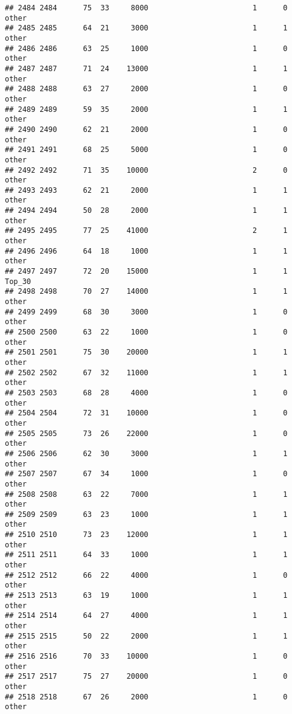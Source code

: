\documentclass[
]{article}
\begin{document}
\begin{verbatim}
## 2484 2484      75  33     8000                        1      0    other
## 2485 2485      64  21     3000                        1      1    other
## 2486 2486      63  25     1000                        1      0    other
## 2487 2487      71  24    13000                        1      1    other
## 2488 2488      63  27     2000                        1      0    other
## 2489 2489      59  35     2000                        1      1    other
## 2490 2490      62  21     2000                        1      0    other
## 2491 2491      68  25     5000                        1      0    other
## 2492 2492      71  35    10000                        2      0    other
## 2493 2493      62  21     2000                        1      1    other
## 2494 2494      50  28     2000                        1      1    other
## 2495 2495      77  25    41000                        2      1    other
## 2496 2496      64  18     1000                        1      1    other
## 2497 2497      72  20    15000                        1      1   Top_30
## 2498 2498      70  27    14000                        1      1    other
## 2499 2499      68  30     3000                        1      0    other
## 2500 2500      63  22     1000                        1      0    other
## 2501 2501      75  30    20000                        1      1    other
## 2502 2502      67  32    11000                        1      1    other
## 2503 2503      68  28     4000                        1      0    other
## 2504 2504      72  31    10000                        1      0    other
## 2505 2505      73  26    22000                        1      0    other
## 2506 2506      62  30     3000                        1      1    other
## 2507 2507      67  34     1000                        1      0    other
## 2508 2508      63  22     7000                        1      1    other
## 2509 2509      63  23     1000                        1      1    other
## 2510 2510      73  23    12000                        1      1    other
## 2511 2511      64  33     1000                        1      1    other
## 2512 2512      66  22     4000                        1      0    other
## 2513 2513      63  19     1000                        1      1    other
## 2514 2514      64  27     4000                        1      1    other
## 2515 2515      50  22     2000                        1      1    other
## 2516 2516      70  33    10000                        1      0    other
## 2517 2517      75  27    20000                        1      0    other
## 2518 2518      67  26     2000                        1      0    other

\end{verbatim}
\end{document}
